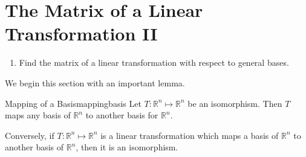 \section{The Matrix of a Linear Transformation II}


\begin{outcome}

\begin{enumerate}

\item[A.] Find the matrix of a linear transformation with respect to general bases. 

\end{enumerate}
\end{outcome}

We begin this section with an important lemma. 

\begin{lemma}{Mapping of a Basis}{mappingbasis}
Let $T: \mathbb{R}^n \mapsto \mathbb{R}^n$ be an isomorphism.  Then $T$ maps any basis of
$\mathbb{R}^n$ to another basis for $\mathbb{R}^n$. 

Conversely, if $T:
\mathbb{R}^n \mapsto \mathbb{R}^n$ is a linear transformation which
maps a basis of $\mathbb{R}^n$ to another basis of $\mathbb{R}^n$,
then it is an isomorphism.
\end{lemma}

